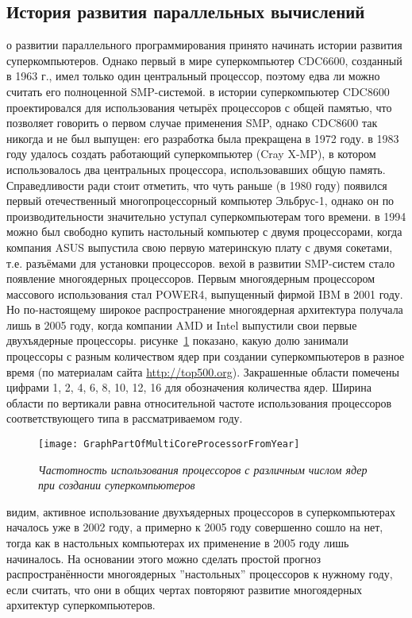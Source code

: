 { %
	\subsection{История развития параллельных вычислений}
	 о развитии параллельного программирования принято начинать истории развития суперкомпьютеров. Однако первый в мире суперкомпьютер CDC6600, созданный в 1963 г., имел только один центральный процессор, поэтому едва ли можно считать его полноценной SMP-системой. 
	 в истории суперкомпьютер CDC8600 проектировался для использования четырёх процессоров с общей памятью, что позволяет говорить о первом случае применения SMP, однако CDC8600 так никогда и не был выпущен: его разработка была прекращена в 1972 году. 
	 в 1983 году удалось создать работающий суперкомпьютер (Cray X-MP), в котором использовалось два центральных процессора, использовавших общую память. Справедливости ради стоит отметить, что чуть раньше (в 1980 году) появился первый отечественный многопроцессорный компьютер Эльбрус-1, однако он по производительности значительно уступал суперкомпьютерам того времени.
	 в 1994 можно был свободно купить настольный компьютер с двумя процессорами, когда компания ASUS выпустила свою первую материнскую плату с двумя сокетами, т.е. разъёмами для установки процессоров.
	 вехой в развитии SMP-систем стало появление многоядерных процессоров. Первым многоядерным процессором массового использования стал POWER4, выпущенный фирмой IBM в 2001 году. Но по-настоящему широкое распространение многоядерная архитектура получала лишь в 2005 году, когда компании AMD и Intel выпустили свои первые двухъядерные процессоры.  
	 рисунке~\ref{GraphPartOfMultiCoreProcessorFromYear:image} показано, какую долю занимали процессоры с разным количеством ядер при создании суперкомпьютеров в разное время (по материалам сайта \url{http://top500.org}). Закрашенные области помечены цифрами 1, 2, 4, 6, 8, 10, 12, 16 для обозначения количества ядер. Ширина области по вертикали равна относительной частоте использования процессоров соответствующего типа в рассматриваемом году.
	\begin{figure}[H]
		\texttt{[image: GraphPartOfMultiCoreProcessorFromYear]}
		\caption{\textit{Частотность использования процессоров с различным числом ядер при создании суперкомпьютеров}}
		\label{GraphPartOfMultiCoreProcessorFromYear:image}
	\end{figure}
	 видим, активное использование двухъядерных процессоров в суперкомпьютерах началось уже в 2002 году, а примерно к 2005 году совершенно сошло на нет, тогда как в настольных компьютерах их применение в 2005 году лишь начиналось. На основании этого можно сделать простой прогноз распространённости многоядерных ''настольных'' процессоров к нужному году, если считать, что они в общих чертах повторяют развитие многоядерных архитектур суперкомпьютеров.
	\par
}